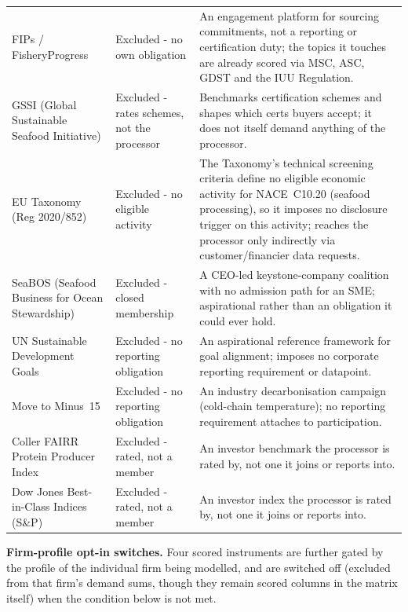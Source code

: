 \documentclass[
]{article}
\begin{document}
\begin{longtable}{@{}p{2.7cm}p{2.3cm}p{6.5cm}@{}}
FIPs / FisheryProgress & Excluded - no own obligation & An engagement platform for sourcing commitments, not a reporting or certification duty; the topics it touches are already scored via MSC, ASC, GDST and the IUU Regulation. \\
GSSI (Global Sustainable Seafood Initiative) & Excluded - rates schemes, not the processor & Benchmarks certification schemes and shapes which certs buyers accept; it does not itself demand anything of the processor. \\
EU Taxonomy (Reg 2020/852) & Excluded - no eligible activity & The Taxonomy's technical screening criteria define no eligible economic activity for NACE~C10.20 (seafood processing), so it imposes no disclosure trigger on this activity; reaches the processor only indirectly via customer/financier data requests. \\
SeaBOS (Seafood Business for Ocean Stewardship) & Excluded - closed membership & A CEO-led keystone-company coalition with no admission path for an SME; aspirational rather than an obligation it could ever hold. \\
UN Sustainable Development Goals & Excluded - no reporting obligation & An aspirational reference framework for goal alignment; imposes no corporate reporting requirement or datapoint. \\
Move to Minus~15 & Excluded - no reporting obligation & An industry decarbonisation campaign (cold-chain temperature); no reporting requirement attaches to participation. \\
Coller FAIRR Protein Producer Index & Excluded - rated, not a member & An investor benchmark the processor is rated by, not one it joins or reports into. \\
Dow Jones Best-in-Class Indices (S\&P) & Excluded - rated, not a member & An investor index the processor is rated by, not one it joins or reports into. \\
\end{longtable}

\textbf{Firm-profile opt-in switches.} Four scored instruments are further
gated by the profile of the individual firm being modelled, and are switched
off (excluded from that firm's demand sums, though they remain scored
columns in the matrix itself) when the condition below is not met.
\end{document}
